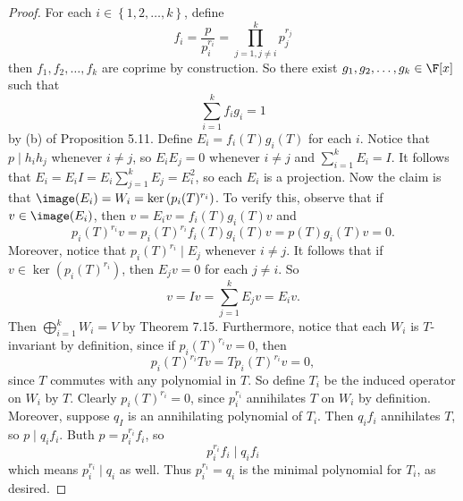 \documentclass[linearalgebra]{subfiles}
\begin{document}
    \begin{proof}
        For each $i\in \left\lbrace 1, 2, \ldots, k \right\rbrace$, define
        \begin{equation*}
            f_i = \frac{p}{p_i^{r_i}} = \prod^{k}_{j=1,j\neq i} p_j^{r_j}
        \end{equation*}
        then $f_1, f_2, \ldots, f_k$ are coprime by construction. So there exist $g_1, g_2, \ldots, g_k\in \F[x]$ such that
        \begin{equation*}
            \sum^{k}_{i=1} f_ig_i = 1
        \end{equation*}
        by (b) of Proposition 5.11. Define $E_i = f_i(T)g_i(T)$ for each $i$. Notice that $p\mid h_ih_j$ whenever $i\neq j$, so $E_iE_j = 0$ whenever $i\neq j$ and $\sum^{k}_{i=1} E_i = I$. It follows that $E_i = E_iI = E_i \sum^{k}_{j=1} E_j = E_i^2$, so each $E_i$ is a projection. Now the claim is that $\image(E_i) = W_i = \ker\left( p_i(T)^{r_i} \right)$. To verify this, observe that if $v\in \image(E_i)$, then $v = E_iv = f_i(T)g_i(T)v$ and
        \begin{equation*}
            p_i(T)^{r_i}v = p_i(T)^{r_i}f_i(T)g_i(T)v = p(T)g_i(T)v = 0.
        \end{equation*}
        Moreover, notice that $p_i(T)^{r_i}\mid E_j$ whenever $i\neq j$. It follows that if $v\in \ker\left( p_i(T)^{r_i} \right)$, then $E_jv = 0$ for each $j\neq i$. So
        \begin{equation*}
            v = Iv = \sum^{k}_{j=1} E_jv = E_iv.
        \end{equation*}
        Then $\bigoplus^{k}_{i=1} W_i = V$ by Theorem 7.15. Furthermore, notice that each $W_i$ is $T$-invariant by definition, since if $p_i(T)^{r_i}v = 0$, then
        \begin{equation*}
            p_i(T)^{r_i}Tv = Tp_i(T)^{r_i}v = 0,
        \end{equation*}
        since $T$ commutes with any polynomial in $T$. So define $T_i$ be the induced operator on $W_i$ by $T$. Clearly $p_i(T)^{r_i} = 0$, since $p_i^{r_i}$ annihilates $T$ on $W_i$ by definition. Moreover, suppose $q_I$ is an annihilating polynomial of $T_i$. Then $q_if_i$ annihilates $T$, so $p\mid q_if_i$. Buth $p = p_i^{r_i}f_i$, so
        \begin{equation*}
            p_i^{r_i}f_i\mid q_if_i
        \end{equation*}
        which means $p_i^{r_i}\mid q_i$ as well. Thus $p_i^{r_i} = q_i$ is the minimal polynomial for $T_i$, as desired.
    \end{proof}
\end{document}
